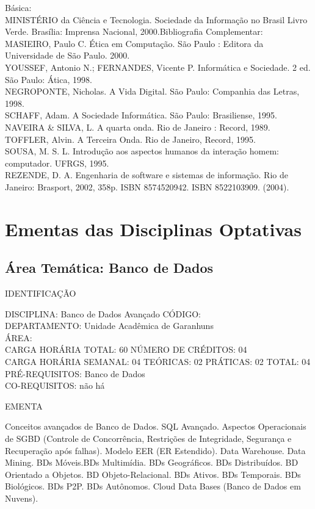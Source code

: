 \documentclass[
	12pt,				%
	openright,			%
  oneside,     %
	a4paper,			%
	chapter=TITLE,		%
	english,			%
	french,				%
	spanish,			%
	brazil				%
	]{abntex2}
\begin{document}
\begin{apendicesenv}
Básica:\\
MINISTÉRIO da Ciência e Tecnologia. Sociedade da Informação 
no Brasil  Livro Verde. Brasília: Imprensa Nacional,
2000.Bibliografia
Complementar:\\
MASIEIRO, Paulo C. Ética em Computação. São Paulo : Editora da
Universidade de São Paulo. 2000.\\
YOUSSEF, Antonio N.; FERNANDES, Vicente P. Informática e Sociedade. 2
ed. São Paulo: Ática, 1998.\\
NEGROPONTE, Nicholas. A Vida Digital. São Paulo: Companhia das Letras,
1998.\\
SCHAFF, Adam. A Sociedade Informática. São Paulo: Brasiliense, 1995.\\
NAVEIRA \& SILVA, L. A quarta onda. Rio de Janeiro : Record, 1989.\\
TOFFLER, Alvin. A Terceira Onda. Rio de Janeiro, Record, 1995.\\
SOUSA, M. S. L. Introdução aos aspectos humanos da 
interação homem: computador. UFRGS, 1995. \\
REZENDE, D. A. Engenharia de software e sistemas de informação. Rio de Janeiro: Brasport, 2002,
358p. ISBN 8574520942. ISBN 8522103909. (2004).


\chapter{Ementas das Disciplinas Optativas}

\section*{Área Temática: Banco de Dados}

IDENTIFICAÇÃO

DISCIPLINA: Banco de Dados Avançado CÓDIGO:\\
DEPARTAMENTO: Unidade Acadêmica de Garanhuns\\
ÁREA: \\
CARGA HORÁRIA TOTAL: 60 NÚMERO DE CRÉDITOS: 04\\
CARGA HORÁRIA SEMANAL: 04 TEÓRICAS: 02 PRÁTICAS: 02 TOTAL: 04\\
PRÉ-REQUISITOS: Banco de Dados\\
CO-REQUISITOS: não há

EMENTA 

Conceitos avançados de Banco de Dados. SQL Avançado. Aspectos
Operacionais de SGBD (Controle de Concorrência, Restrições de
Integridade, Segurança e Recuperação após falhas). Modelo EER (ER
Estendido). Data Warehouse. Data Mining. BDs Móveis.BDs Multimídia. BDs Geográficos. BDs Distribuídos. BD Orientado a
Objetos. BD Objeto-Relacional. BDs Ativos. BDs Temporais. BDs
Biológicos. BDs P2P. BDs Autônomos. Cloud Data Bases (Banco de Dados em
Nuvens).


\end{apendicesenv}
\end{document}
